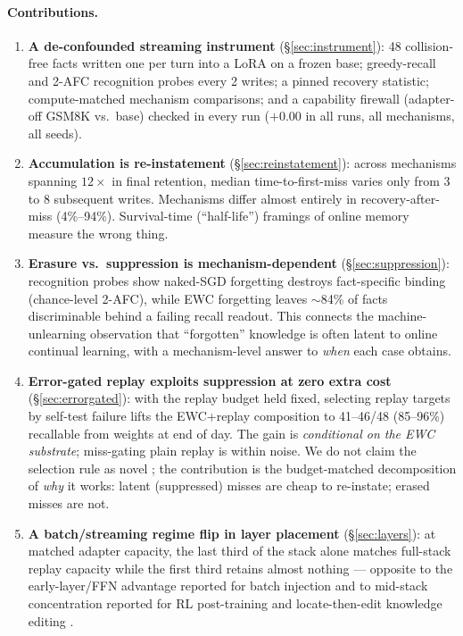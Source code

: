 \documentclass[11pt]{article}
\begin{document}
\paragraph{Contributions.}
\begin{enumerate}
\item \textbf{A de-confounded streaming instrument} (\S\ref{sec:instrument}): 48 collision-free facts
written one per turn into a LoRA on a frozen base; greedy-recall and 2-AFC recognition probes every 2
writes; a pinned recovery statistic; compute-matched mechanism comparisons; and a capability firewall
(adapter-off GSM8K vs.\ base) checked in every run ($+0.00$ in all runs, all mechanisms, all seeds).
\item \textbf{Accumulation is re-instatement} (\S\ref{sec:reinstatement}): across mechanisms spanning
$12\times$ in final retention, median time-to-first-miss varies only from 3 to 8 subsequent writes.
Mechanisms differ almost entirely in recovery-after-miss (4\%--94\%). Survival-time (``half-life'')
framings of online memory measure the wrong thing.
\item \textbf{Erasure vs.\ suppression is mechanism-dependent} (\S\ref{sec:suppression}): recognition
probes show naked-SGD forgetting destroys fact-specific binding (chance-level 2-AFC), while EWC
forgetting leaves $\sim$84\% of facts discriminable behind a failing recall readout. This connects the
machine-unlearning observation that ``forgotten'' knowledge is often latent
\citep{unlearning-deletion,quantization-unlearning,kotha2023} to online continual learning, with a
mechanism-level answer to \emph{when} each case obtains.
\item \textbf{Error-gated replay exploits suppression at zero extra cost} (\S\ref{sec:errorgated}):
with the replay budget held fixed, selecting replay targets by self-test failure lifts the EWC+replay
composition to 41--46/48 (85--96\%) recallable from weights at end of day. The gain is
\emph{conditional on the EWC substrate}; miss-gating plain replay is within noise. We do not claim the
selection rule as novel \citep{aljundi2019mir,sure2025,mssr2026}; the contribution is the budget-matched
decomposition of \emph{why} it works: latent (suppressed) misses are cheap to re-instate; erased misses
are not.
\item \textbf{A batch/streaming regime flip in layer placement} (\S\ref{sec:layers}): at matched
adapter capacity, the last third of the stack alone matches full-stack replay capacity while the first
third retains almost nothing --- opposite to the early-layer/FFN advantage reported for batch injection
\citep{back2026lora} and to mid-stack concentration reported for RL post-training \citep{onelayer2026}
and locate-then-edit knowledge editing \citep{meng2022rome,meng2023memit}.
\end{enumerate}
\end{document}

